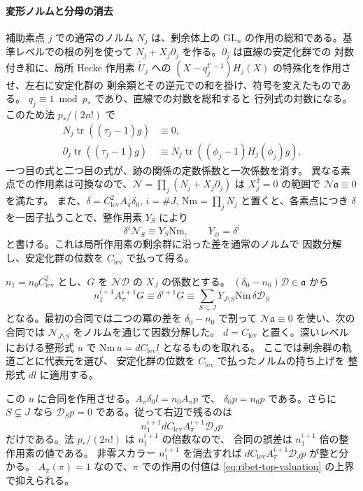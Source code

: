 \paragraph{変形ノルムと分母の消去}
補助素点 \(j\) での通常のノルム \(N_j\) は、剰余体上の
\(\mathrm{GL}_{n}\) の作用の総和である。基準レベルでの根の列を使って
\(N_j+X_j\partial_j\) を作る。\(\partial_j\) は直線の安定化群での
対数付き和に、局所 Hecke 作用素 \(\widetilde U_j\) への
\((X-q_j^{t'-1})H_j(X)\) の特殊化を作用させ、左右に安定化群の
剰余類とその逆元での和を掛け、符号を変えたものである。
\(q_j\equiv1\bmod p_\ast\) であり、直線での対数を総和すると
行列式の対数になる。このため法 \(p_\ast/(2n!)\) で
\[
 \begin{split}
 N_j\operatorname{tr}((\tau_j-1)g)&\equiv0,\\
 \partial_j\operatorname{tr}((\tau_j-1)g)
   &\equiv N_j\operatorname{tr}((\phi_j-1)H_j(\phi_j)g).
 \end{split}
\]
一つ目の式と二つ目の式が、跡の関係の定数係数と一次係数を消す。
異なる素点での作用素は可換なので、\(\mathcal N=\prod_j(N_j+X_j\partial_j)\)
は \(X_j^2=0\) の範囲で \(\mathcal N\mathfrak a\equiv0\) を満たす。
また、\(\delta=C_{\mathrm{lev}}^2 A_\pi\delta_0\),
\(i=\#J\), \(\mathrm{Nm}=\prod_j N_j\) と置くと、各素点につき
\(\delta\) を一因子払うことで、整作用素 \(Y_S\) により
\[
 \delta^i\mathcal N_S\equiv Y_S\mathrm{Nm},\qquad
 Y_\varnothing=\delta^i
\]
と書ける。これは局所作用素の剰余群に沿った差を通常のノルムで
因数分解し、安定化群の位数を \(C_{\mathrm{lev}}\) で払って得る。

\(n_1=n_0 C_{\mathrm{lev}}^2\) とし、\(G\) を
\(\mathcal N\mathcal D\) の \(X_J\) の係数とする。
\((\delta_0-n_0)\mathcal D\in\mathfrak a\) から
\[
 n_1^{i+1} A_\pi^{i+1}G
 \equiv \delta^{i+1}G
 \equiv \sum_{S\subseteq J}Y_{J\setminus S}\mathrm{Nm}\,\delta\mathcal D_S
\]
となる。最初の合同では二つの冪の差を \(\delta_0-n_0\) で割って
\(\mathcal N\mathfrak a\equiv0\) を使い、次の合同では
\(\mathcal N_{J\setminus S}\) をノルムを通じて因数分解した。
\(d=C_{\mathrm{lev}}\) と置く。深いレベルにおける整形式 \(u\) で
\(\mathrm{Nm}\,u=d C_{\mathrm{lev}}l\) となるものを取れる。
ここでは剰余群の軌道ごとに代表元を選び、
安定化群の位数を \(C_{\mathrm{lev}}\) で払ったノルムの持ち上げを
整形式 \(dl\) に適用する。

この \(u\) に合同を作用させる。\(A_\pi\delta_0l=n_0 A_\pi p\) で、
\(\delta_0p=n_0p\) である。さらに \(S\subsetneq J\) なら
\(\mathcal D_Sp=0\) である。従って右辺で残るのは
\[
 n_1^{i+1}d C_{\mathrm{lev}} A_\pi^{i+1}\mathcal D_J p
\]
だけである。法 \(p_\ast/(2n!)\) は \(n_1^{i+1}\) の倍数なので、
合同の誤差は \(n_1^{i+1}\) 倍の整作用素の値である。
非零スカラー \(n_1^{i+1}\) を消去すれば
\(d C_{\mathrm{lev}} A_\pi^{i+1}\mathcal D_Jp\) が整と分かる。
\(A_\pi(\pi)=1\) なので、\(\pi\) での作用の付値は
\eqref{eq:ribet-top-valuation} の上界で抑えられる。

